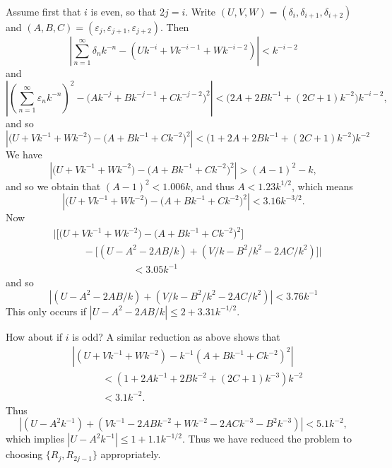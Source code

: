 \documentclass[dvipsnames,letterpaper,12pt]{article}
\numberwithin{equation}{section}
\numberwithin{theorem}{section}
\begin{document}
Assume first that $i$ is even, so that $2j = i$. Write $(U,V,W) = (\delta_i, \delta_{i+1}, \delta_{i+2})$ and $(A,B,C) = (\varepsilon_j, \varepsilon_{j+1}, \varepsilon_{j+2})$. Then
%
\[ \left| \sum_{n = 1}^\infty \delta_n k^{-n} - (U k^{-i} + V k^{-i-1} + W k^{-i-2}) \right| < k^{-i-2} \]
%
and
%
\[ \left| \left( \sum_{n = 1}^\infty \varepsilon_n k^{-n} \right)^2 - \Big( A k^{-j} + B k^{-j - 1} + C k^{-j-2} \Big)^2 \right| < \Big( 2 A + 2 B k^{-1} + (2 C + 1) k^{-2} \Big) k^{-i-2}, \]
and so
%
\[ \left| \Big( U + V k^{-1} + W k^{-2} \Big) - \Big( A + B k^{-1} + C k^{-2} \Big)^2 \right| < \Big( 1 + 2 A + 2B k^{-1} + (2 C + 1) k^{-2} \Big) k^{-2} \]
%
We have
%
\[ \left| \Big( U + V k^{-1} + W k^{-2} \Big) - \Big( A + B k^{-1} + C k^{-2} \Big)^2 \right| > (A-1)^2 - k, \]
and so we obtain that $(A - 1)^2 < 1.006k$, and thus $A < 1.23 k^{1/2}$, which means
%
\[ \left| \Big( U + V k^{-1} + W k^{-2} \Big) - \Big( A + B k^{-1} + C k^{-2} \Big)^2 \right| < 3.16k^{-3/2}. \]
Now
%
\begin{align*}
    &\Bigg| \Big[ \Big( U + V k^{-1} + W k^{-2} \Big) - \Big( A + B k^{-1} + C k^{-2} \Big)^2 \Big]\\
    &\quad\quad\quad - \Big[ (U-A^2 - 2AB/k) + (V/k - B^2/k^2 - 2AC/k^2) \Big] \Bigg|\\
    &\quad\quad\quad\quad\quad\quad\quad\quad< 3.05 k^{-1}
\end{align*}
and so
%
\[ |(U-A^2 - 2AB/k) + (V/k - B^2/k^2 - 2AC/k^2)| < 3.76k^{-1} \]
This only occurs if $|U - A^2 - 2AB/k| \leq 2 + 3.31k^{-1/2}$.

How about if $i$ is odd? A similar reduction as above shows that
%
\begin{align*}
    &|(U + Vk^{-1} + Wk^{-2}) - k^{-1} (A + Bk^{-1} + Ck^{-2})^2|\\
    &\quad\quad\quad< (1 + 2Ak^{-1} + 2Bk^{-2} + (2C + 1)k^{-3}) k^{-2}\\
    &\quad\quad\quad < 3.1k^{-2}.
\end{align*}
Thus
%
\[ |(U - A^2 k^{-1}) + (Vk^{-1} - 2ABk^{-2} + Wk^{-2} -2AC k^{-3} - B^2 k^{-3})| < 5.1 k^{-2}, \]
%
which implies $|U - A^2 k^{-1}| \leq 1 + 1.1 k^{-1/2}$. Thus we have reduced the problem to choosing $\{ R_j, R_{2j-1} \}$ appropriately.

\newpage
\end{document}
